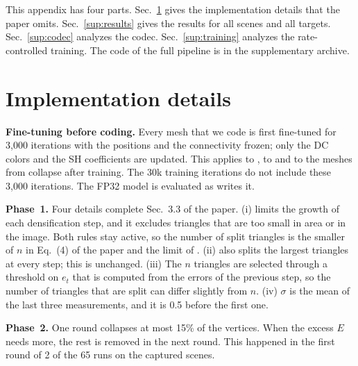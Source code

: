 \appendix
\setcounter{table}{0}
\setcounter{figure}{0}
\setcounter{equation}{0}
\providecommand{\MipNeRF}{\emph{Mip-NeRF~360}\xspace}
\providecommand{\TandT}{\emph{Tanks and Temples}\xspace}
\providecommand{\DeepBlending}{\emph{Deep Blending}\xspace}
\providecommand{\NeRFSyn}{\emph{NeRF-Synthetic}\xspace}

This appendix has four parts. Sec.~\ref{sup:impl} gives the implementation details that the paper omits. Sec.~\ref{sup:results} gives the results for all scenes and all targets. Sec.~\ref{sup:codec} analyzes the codec. Sec.~\ref{sup:training} analyzes the rate-controlled training. The code of the full pipeline is in the supplementary archive.

\section{Implementation details}
\label{sup:impl}

\noindent\textbf{Fine-tuning before coding.} Every mesh that we code is first fine-tuned for 3{,}000 iterations with the positions and the connectivity frozen; only the DC colors and the SH coefficients are updated. This applies to \BM, to \MSc and to the meshes from collapse after training. The 30k training iterations do not include these 3{,}000 iterations. The FP32 model is evaluated as \MS writes it.

\noindent\textbf{Phase~1.} Four details complete Sec.~3.3 of the paper. (i) \MS limits the growth of each densification step, and it excludes triangles that are too small in area or in the image. Both rules stay active, so the number of split triangles is the smaller of $n$ in Eq.~(4) of the paper and the limit of \MS. (ii) \MS also splits the largest triangles at every step; this is unchanged. (iii) The $n$ triangles are selected through a threshold on $e_t$ that is computed from the errors of the previous step, so the number of triangles that are split can differ slightly from $n$. (iv) $\sigma$ is the mean of the last three measurements, and it is 0.5 before the first one.

\noindent\textbf{Phase~2.} One round collapses at most 15\% of the vertices. When the excess $E$ needs more, the rest is removed in the next round. This happened in the first round of 2 of the 65 runs on the captured scenes.

